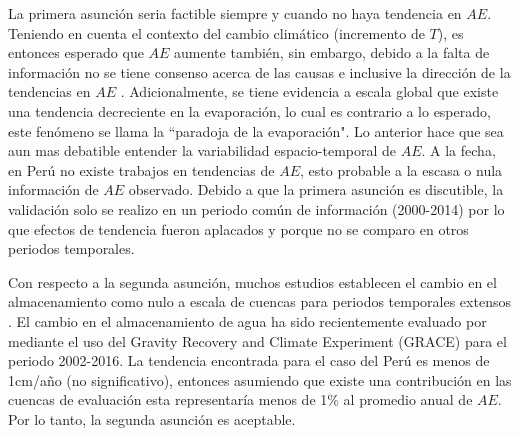 \documentclass[12pt]{article}
\begin{document}
La primera asunción seria factible siempre y cuando no haya tendencia en $AE$. Teniendo en cuenta el contexto del cambio climático (incremento de $T$), es entonces esperado que $AE$ aumente también, sin embargo, debido a la falta de información no se tiene consenso acerca de las causas e inclusive la dirección de la tendencias en $AE$ \citep{hobbins2004trends,cong2009does,wang2011trends,miralles2016wacmos,douville2013anthropogenic,zhang2016multi}. Adicionalmente, se tiene evidencia a escala global que existe una tendencia decreciente en la evaporación, lo cual es contrario a lo esperado, este fenómeno se llama la “paradoja de la evaporación". Lo anterior hace que sea aun mas debatible entender la variabilidad espacio-temporal de $AE$. A la fecha, en Perú no existe trabajos en tendencias de $AE$, esto probable a la escasa o nula información de $AE$ observado. Debido a que la primera asunción es discutible, la validación solo se realizo en un periodo común de información (2000-2014) por lo que efectos de tendencia fueron aplacados y porque no se comparo en otros periodos temporales.

Con respecto a la segunda asunción, muchos estudios establecen el cambio en el almacenamiento como nulo a escala de cuencas para periodos temporales extensos \citep{Budyko1961,Fu1981,Zhang2008,Wang2014,Singh2015}. El cambio en el almacenamiento de agua ha sido recientemente evaluado por \citet{rodell2018emerging} mediante el uso del Gravity Recovery and Climate Experiment (GRACE) para el periodo 2002-2016. La tendencia encontrada para el caso del Perú es menos de 1cm/año (no significativo), entonces asumiendo que existe una contribución en las cuencas de evaluación esta representaría menos de 1\% al promedio anual de $AE$. Por lo tanto, la segunda asunción es aceptable. 
\end{document}
